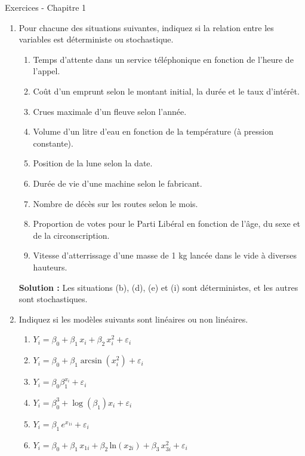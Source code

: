 \documentclass[letter, 11pt]{article}
\newcommand{\prof}[1]{\ifdefined\avecsolutions\par{\color{blue}\textbf{Solution :} #1}\par\fi}
\begin{document}
\vspace*{0.01 cm}
\begin{center}
{\Large Exercices - Chapitre 1}
\end{center}



\begin{enumerate}[leftmargin=*, wide, label=\bf Exercice \arabic*:]

\item Pour chacune des situations suivantes, indiquez si la relation entre les variables est déterministe ou stochastique. 

\begin{enumerate}
  \item Temps d'attente dans un service  téléphonique en fonction de l'heure de l'appel.
	\item Coût d'un emprunt selon le montant initial, la durée et le taux d'intérêt.
	\item Crues maximale d'un fleuve selon l'année.
	\item Volume d'un litre d'eau en fonction de la température (à pression constante).
	\item Position de la lune selon la date.
  \item Durée de vie d'une machine selon le fabricant.
  \item Nombre de décès sur les routes selon le mois.
  \item Proportion de votes pour le Parti Libéral en fonction de l'âge, du sexe et de la circonscription.
	\item Vitesse d'atterrissage d'une masse de 1 kg lancée dans le vide à diverses hauteurs.
  \end{enumerate}

\prof{Les situations (b), (d), (e) et (i) sont déterministes, et les autres sont stochastiques.}

\vspace{0.1 in}
\item
Indiquez si les modèles suivants  sont linéaires ou non linéaires.

\begin{enumerate}
\item $Y_i=\beta_0+\beta_1\,x_i+\beta_2\,x_i^2+\varepsilon_i$
\item $Y_i=\beta_0+\beta_1\arcsin(x_i^2)+\varepsilon_i$
\item $Y_i=\beta_0\beta_1^{x_i}+\varepsilon_i$
\item $Y_i=\beta_0^3+\log(\beta_1)x_i+\varepsilon_i$
\item $Y_i = \beta_1\,e^{x_{1i}}+\varepsilon_i$
\item $Y_i=\beta_0 + \beta_1\,x_{1i}+ \beta_2\,\text{ln}(x_{2i})+ \beta_3\,x_{3i}^2+ \varepsilon_i$
\end{enumerate}


\end{enumerate}
\end{document}
